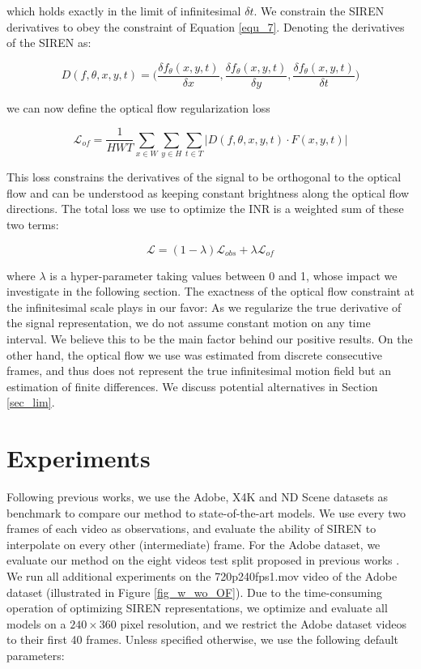 \documentclass{article}
\begin{document}
which holds exactly in the limit of infinitesimal $\delta t$.
We constrain the SIREN derivatives to obey the constraint of Equation \ref{equ_7}.
Denoting the derivatives of the SIREN as:

\begin{equation}
D(f, \theta, x, y, t)=\Big(\frac{\delta f_{\theta}(x,y,t)}{\delta x}, \frac{\delta f_{\theta}(x,y,t)}{\delta y}, \frac{\delta f_{\theta}(x,y,t)}{\delta t}\Big)
\end{equation}

we can now define the optical flow regularization loss

\begin{equation}
\mathcal{L}_{of} = \frac{1}{HWT} \sum_{x \in W}\sum_{y \in H}\sum_{t \in T} | D(f, \theta, x, y, t) \cdot F(x, y, t) |
\end{equation}

This loss constrains the derivatives of the signal to be orthogonal to the optical flow and
can be understood as keeping constant brightness along the optical flow directions.
The total loss we use to optimize the INR is a weighted sum of these two terms:

\begin{equation}
\mathcal{L} = (1-\lambda) \mathcal{L}_{obs} + \lambda \mathcal{L}_{of}
\end{equation}

where $\lambda$ is a hyper-parameter taking values between 0 and 1, whose impact we investigate in the following section.
The exactness of the optical flow constraint at the infinitesimal scale plays in our favor:
As we regularize the true derivative of the signal representation,
we do not assume constant motion on any time interval.
We believe this to be the main factor behind our positive results.
On the other hand, the optical flow we use was estimated from discrete consecutive frames,
and thus does not represent the true infinitesimal motion field but an estimation of finite differences.
We discuss potential alternatives in Section \ref{sec_lim}.

\section{Experiments}
\label{sec_exp}

Following previous works, we use the Adobe\cite{su2017deep}, X4K\cite{sim2021xvfi} and ND Scene\cite{yoon2020novel}
datasets as benchmark to compare our method to state-of-the-art models.
We use every two frames of each video as observations,
and evaluate the ability of SIREN to interpolate on every other (intermediate) frame.
For the Adobe dataset, we evaluate our method on the eight videos test split proposed in previous works \citep{jiang2018super}.
We run all additional experiments on the 720p240fps1.mov video of the Adobe dataset (illustrated in Figure \ref{fig_w_wo_OF}).
Due to the time-consuming operation of optimizing SIREN representations,
we optimize and evaluate all models on a $240 \times 360$ pixel resolution,
and we restrict the Adobe dataset videos to their first 40 frames.
Unless specified otherwise, we use the following default parameters:
\end{document}
